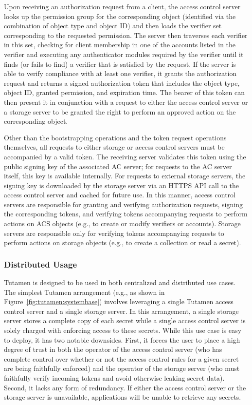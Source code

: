 Upon receiving an authorization request from a client, the access
control server looks up the permission group for the corresponding
object (identified via the combination of object type and object ID)
and then loads the verifier set corresponding to the requested
permission. The server then traverses each verifier in this set,
checking for client membership in one of the accounts listed in the
verifier and executing any authenticator modules required by the
verifier until it finds (or fails to find) a verifier that is
satisfied by the request. If the server is able to verify compliance
with at least one verifier, it grants the authorization request and
returns a signed authorization token that includes the object type,
object ID, granted permission, and expiration time. The bearer of this
token can then present it in conjunction with a request to either the
access control server or a storage server to be granted the right to
perform an approved action on the corresponding object.

Other than the bootstrapping operations and the token request
operations themselves, all requests to either storage or access
control servers must be accompanied by a valid token. The receiving
server validates this token using the public signing key of the
associated AC server; for requests to the AC server itself, this key
is available internally. For requests to external storage servers, the
signing key is downloaded by the storage server via an HTTPS API call
to the access control server and cached for future use. In this
manner, access control servers are responsible for granting and
verifying authorization requests, signing the corresponding tokens,
and verifying tokens accompanying requests to perform actions on ACS
objects (e.g., to create or modify verifiers or accounts). Storage
servers are responsible only for verifying tokens accompanying
requests to perform actions on storage objects (e.g., to create a
collection or read a secret).

\subsubsection{Distributed Usage}
\label{sec:tutamen:arch:distributed}

Tutamen is designed to be used in both centralized and distributed use
cases. The simplest Tutamen arrangement (e.g., as shown in
Figure~\ref{fig:tutamen:systembase}) involves leveraging a single
Tutamen access control server and a single storage server. In this
arrangement, a single storage server stores a complete copy of each
secret while a single access control server is solely charged with
enforcing access to these secrets. While this use case is easy to
deploy, it has two notable downsides. First, it forces the user to
place a high degree of trust in both the operator of the access
control server (who has complete control over whether or not the
access control rules for a given secret are being faithfully enforced)
and the operator of the storage server (who must faithfully verify
incoming tokens and avoid otherwise leaking secret data). Second, it
lacks any form of redundancy. If either the access control server or
the storage server is unavailable, applications will be unable to
retrieve any secrets.

